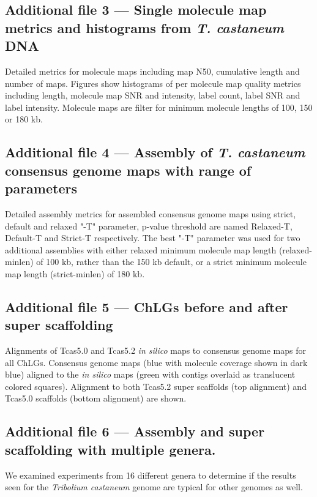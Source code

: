 \documentclass{bmcart}
\begin{document}
\begin{backmatter}
  \subsection*{Additional file 3 --- Single molecule map metrics and histograms from \textit{T. castaneum} DNA}
    Detailed metrics for molecule maps including map N50, cumulative length and number of maps. Figures show histograms of per molecule map quality metrics including length, molecule map SNR and intensity, label count, label SNR and label intensity. Molecule maps are filter for minimum molecule lengths of 100, 150 or 180 kb.

  \subsection*{Additional file 4 --- Assembly of \textit{T. castaneum} consensus genome maps with range of parameters}
    Detailed assembly metrics for assembled consensus genome maps using strict, default and relaxed "-T" parameter, p-value threshold are named Relaxed-T, Default-T and Strict-T respectively. The best "-T" parameter was used for two additional assemblies with either relaxed minimum molecule map length (relaxed-minlen) of 100 kb, rather than the 150 kb default, or a strict minimum molecule map length (strict-minlen) of 180 kb. 

  \subsection*{Additional file 5 --- ChLGs before and after super scaffolding }
    Alignments of Tcas5.0 and Tcas5.2 \textit{in silico} maps to consensus genome maps for all ChLGs. Consensus genome maps (blue with molecule coverage shown in dark blue) aligned to the \textit{in silico} maps (green with contigs overlaid as translucent colored squares). Alignment to both Tcas5.2 super scaffolds (top alignment) and Tcas5.0 scaffolds (bottom alignment) are shown.

 \subsection*{Additional file 6 --- Assembly and super scaffolding with multiple genera. }
    We examined experiments from 16 different genera to determine if the results seen for the \textit{Tribolium castaneum} genome are typical for other genomes as well.



\end{backmatter}
\end{document}
